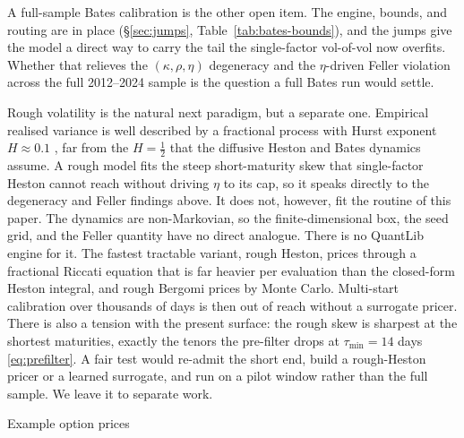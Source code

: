 \documentclass[a4paper, 11pt, reqno]{amsart}
\makeatletter
\def\section{\@startsection{section}{1}%
  \z@{.7\linespacing\@plus\linespacing}{.5\linespacing}%
  {\normalfont\bfseries\centering}}
\makeatother
\begin{document}
			A full-sample Bates calibration is the other open item. The engine, bounds, and routing are in
			place (\S\ref{sec:jumps}, Table~\ref{tab:bates-bounds}), and the jumps give the model a direct way
			to carry the tail the single-factor vol-of-vol now overfits. Whether that relieves the
			$(\kappa,\rho,\eta)$ degeneracy and the $\eta$-driven Feller violation across the full 2012--2024
			sample is the question a full Bates run would settle.
		
			Rough volatility is the natural next paradigm, but a separate one. Empirical realised variance is
			well described by a fractional process with Hurst exponent $H\approx 0.1$ \citep{gatheral2018}, far
			from the $H=\tfrac12$ that the diffusive Heston and Bates dynamics assume. A rough model fits the
			steep short-maturity skew that single-factor Heston cannot reach without driving $\eta$ to its cap,
			so it speaks directly to the degeneracy and Feller findings above. It does not, however, fit the
			routine of this paper. The dynamics are non-Markovian, so the finite-dimensional box, the seed grid,
			and the Feller quantity have no direct analogue. There is no QuantLib engine for it. The fastest
			tractable variant, rough Heston, prices through a fractional Riccati equation
			\citep{eleuch2019} that is far heavier per evaluation than the closed-form Heston integral, and
			rough Bergomi \citep{bayer2016} prices by Monte Carlo. Multi-start calibration over thousands of
			days is then out of reach without a surrogate pricer. There is also a tension with the present
			surface: the rough skew is sharpest at the shortest maturities, exactly the tenors the pre-filter
			drops at $\tau_{\min}=14$ days \eqref{eq:prefilter}. A fair test would re-admit the short end, build
			a rough-Heston pricer or a learned surrogate, and run on a pilot window rather than the full sample.
			We leave it to separate work.
		
	\vfill
	{\small
		
		
	}
	\vfill
	\newpage
	
	\appendix
	
	\section{Example option prices}
		
		\newpage
		
		\newpage
	
	\begingroup
	\raggedbottom
	
\end{document}

